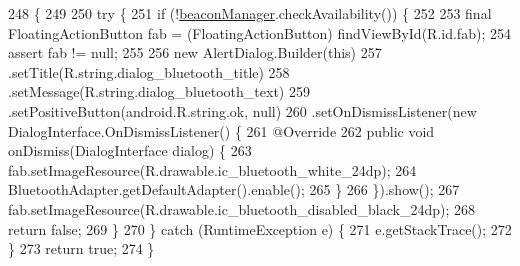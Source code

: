 \begin{DoxyCode}
248                                            \{
249 
250         \textcolor{keywordflow}{try} \{
251             \textcolor{keywordflow}{if} (!\hyperlink{classit_1_1unibo_1_1torsello_1_1bluetoothpositioning_1_1activities_1_1ApplicationActivity_a973c37226a3dbba6016966c3555aff65_a973c37226a3dbba6016966c3555aff65}{beaconManager}.checkAvailability()) \{
252 
253                 \textcolor{keyword}{final} FloatingActionButton fab = (FloatingActionButton) findViewById(R.id.fab);
254                 assert fab != null;
255 
256                 \textcolor{keyword}{new} AlertDialog.Builder(\textcolor{keyword}{this})
257                         .setTitle(R.string.dialog\_bluetooth\_title)
258                         .setMessage(R.string.dialog\_bluetooth\_text)
259                         .setPositiveButton(android.R.string.ok, null)
260                         .setOnDismissListener(\textcolor{keyword}{new} DialogInterface.OnDismissListener() \{
261                             @Override
262                             \textcolor{keyword}{public} \textcolor{keywordtype}{void} onDismiss(DialogInterface dialog) \{
263                                 fab.setImageResource(R.drawable.ic\_bluetooth\_white\_24dp);
264                                 BluetoothAdapter.getDefaultAdapter().enable();
265                             \}
266                         \}).show();
267                 fab.setImageResource(R.drawable.ic\_bluetooth\_disabled\_black\_24dp);
268                 \textcolor{keywordflow}{return} \textcolor{keyword}{false};
269             \}
270         \} \textcolor{keywordflow}{catch} (RuntimeException e) \{
271             e.getStackTrace();
272         \}
273         \textcolor{keywordflow}{return} \textcolor{keyword}{true};
274     \}
\end{DoxyCode}
\hypertarget{classit_1_1unibo_1_1torsello_1_1bluetoothpositioning_1_1activities_1_1ApplicationActivity_a0cdfc0658ba462b43e9e6b94bab90da1_a0cdfc0658ba462b43e9e6b94bab90da1}{}\label{classit_1_1unibo_1_1torsello_1_1bluetoothpositioning_1_1activities_1_1ApplicationActivity_a0cdfc0658ba462b43e9e6b94bab90da1_a0cdfc0658ba462b43e9e6b94bab90da1} 
